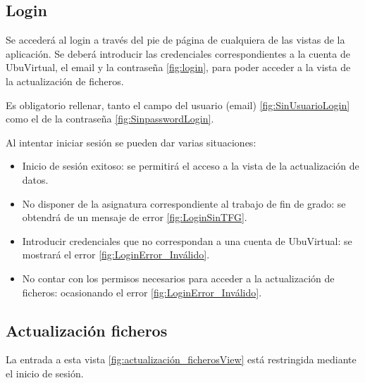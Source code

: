 \subsection{Login} 
Se accederá al login a través del pie de página de cualquiera de las vistas de la aplicación. Se deberá introducir las credenciales correspondientes a la cuenta de UbuVirtual, el email y la contraseña \ref{fig:login}, para poder acceder a la vista de la actualización de ficheros.

Es obligatorio rellenar, tanto el campo del usuario (email) \ref{fig:SinUsuarioLogin} como el de la contraseña \ref{fig:SinpasswordLogin}.


Al intentar iniciar sesión se pueden dar varias situaciones:
\begin{itemize}
	\item Inicio de sesión exitoso: se permitirá el acceso a la vista de la actualización de datos.
	
	\item No disponer de la asignatura correspondiente al trabajo de fin de grado: se obtendrá de un mensaje de error \ref{fig:LoginSinTFG}.  	
	
	\item Introducir credenciales que no correspondan a una cuenta de UbuVirtual: se mostrará el error \ref{fig:LoginError_Inválido}.	
	
	\item No contar con los permisos necesarios para acceder a la actualización de ficheros: ocasionando el error \ref{fig:LoginError_Inválido}.
\end{itemize}

\subsection{Actualización ficheros} 
La entrada a esta vista \ref{fig:actualización_ficherosView} está restringida mediante el inicio de sesión.    

